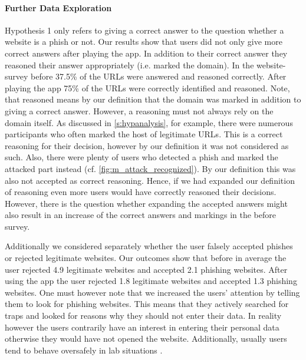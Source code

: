 \paragraph{Further Data Exploration}
\begin{description}[leftmargin=0cm]
	\item[Correct and Reasoned Answers:] Hypothesis 1 only refers to giving a correct answer to the question whether a website is a phish or not.
	Our results show that users did not only give more correct answers after playing the app.
	In addition to their correct answer they reasoned their answer appropriately (i.e. marked the domain).
	In the website-survey before 37.5\% of the URLs were answered and reasoned correctly.
	After playing the app 75\% of the URLs were correctly identified and reasoned. 
	Note, that reasoned means by our definition that the domain was marked in addition to giving a correct answer.
	However, a reasoning must not always rely on the domain itself. 
	As discussed in \autoref{s:hypanalysis}, for example, there were numerous participants who often marked the host of legitimate URLs.
	This is a correct reasoning for their decision, however by our definition it was not considered as such.
	Also, there were plenty of users who detected a phish and marked the attacked part instead (cf. \autoref{fig:m_attack_recognized}).
	By our definition this was also not accepted as correct reasoning.
	Hence, if we had expanded our definition of reasoning even more users would have correctly reasoned their decisions.
	However, there is the question whether expanding the accepted answers might also result in an increase of the correct answers and markings in the before survey.
	\item[False Negatives and Positives:] Additionally we considered separately whether the user falsely  accepted phishes or rejected legitimate websites. Our outcomes show that before in average the user rejected 4.9 legitimate websites and accepted 2.1 phishing websites.
	After using the app the user rejected 1.8 legitimate websites and accepted 1.3 phishing websites.
	One must however note that we increased the users' attention by telling them to look for phishing websites.
	This means that they actively searched for traps and looked for reasons why they should not enter their data.
	In reality however the users contrarily have an interest in entering their personal data otherwise they would have not opened the website.
	Additionally, usually users tend to behave oversafely in lab situations \cite{wu2006security, egelman2007security}.

\end{description}
